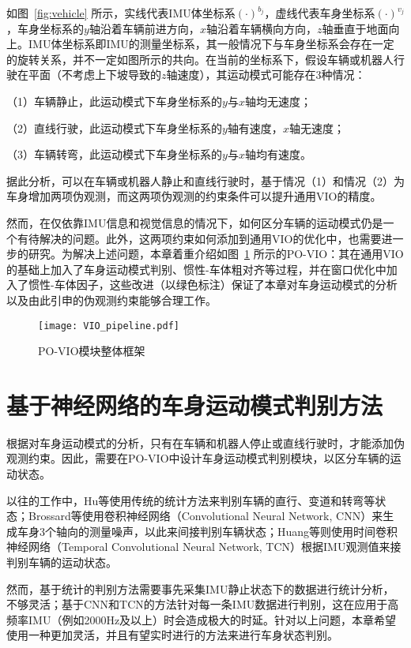 如图~\ref{fig:vehicle} 所示，实线代表IMU体坐标系$(\cdot)^{b_{j}}$，虚线代表车身坐标系$(\cdot)^{v_{j}}$，车身坐标系的$y$轴沿着车辆前进方向，$x$轴沿着车辆横向方向，$z$轴垂直于地面向上。IMU体坐标系即IMU的测量坐标系，其一般情况下与车身坐标系会存在一定的旋转关系，并不一定如图所示的共向。在当前的坐标系下，假设车辆或机器人行驶在平面（不考虑上下坡导致的$z$轴速度），其运动模式可能存在3种情况：

（1）车辆静止，此运动模式下车身坐标系的$y$与$x$轴均无速度；

（2）直线行驶，此运动模式下车身坐标系的$y$轴有速度，$x$轴无速度；

（3）车辆转弯，此运动模式下车身坐标系的$y$与$x$轴均有速度。

据此分析，可以在车辆或机器人静止和直线行驶时，基于情况（1）和情况（2）为车身增加两项伪观测，而这两项伪观测的约束条件可以提升通用VIO的精度。

然而，在仅依靠IMU信息和视觉信息的情况下，如何区分车辆的运动模式仍是一个有待解决的问题。此外，这两项约束如何添加到通用VIO的优化中，也需要进一步的研究。为解决上述问题，本章着重介绍如图~\ref{fig:vio_pipeline} 所示的PO-VIO：其在通用VIO的基础上加入了车身运动模式判别、惯性-车体粗对齐等过程，并在窗口优化中加入了惯性-车体因子，这些改进（以绿色标注）保证了本章对车身运动模式的分析以及由此引申的伪观测约束能够合理工作。

\begin{figure}
  \centering
  \texttt{[image: VIO\_pipeline.pdf]}
  \caption{PO-VIO模块整体框架}
  \label{fig:vio_pipeline}
\end{figure}

\section{基于神经网络的车身运动模式判别方法}
\label{sec:vehicle_state}

根据对车身运动模式的分析，只有在车辆和机器人停止或直线行驶时，才能添加伪观测约束。因此，需要在PO-VIO中设计车身运动模式判别模块，以区分车辆的运动状态。

以往的工作中，Hu等\cite{hu2020memsimu}使用传统的统计方法来判别车辆的直行、变道和转弯等状态；Brossard等\cite{brossard2020ai}使用卷积神经网络（Convolutional Neural Network, CNN）来生成车身3个轴向的测量噪声，以此来间接判别车辆状态；Huang等\cite{huang2022vehicle}则使用时间卷积神经网络（Temporal Convolutional Neural Network, TCN）根据IMU观测值来接判别车辆的运动状态。

然而，基于统计的判别方法需要事先采集IMU静止状态下的数据进行统计分析，不够灵活；基于CNN和TCN的方法针对每一条IMU数据进行判别，这在应用于高频率IMU（例如2000Hz及以上）时会造成极大的时延。针对以上问题，本章希望使用一种更加灵活，并且有望实时进行的方法来进行车身状态判别。


